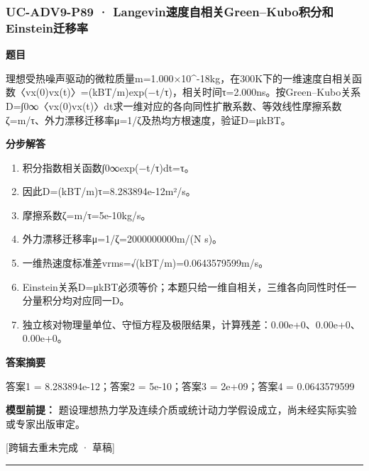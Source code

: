 \documentclass[UTF8,11pt,a4paper]{ctexart}
\begin{document}
\subsubsection*{UC-ADV9-P89 · Langevin速度自相关Green–Kubo积分和Einstein迁移率}
\noindent\textbf{题目}\par
理想受热噪声驱动的微粒质量m=1.000×10\textasciicircum{}-18kg，在300K下的一维速度自相关函数〈vx(0)vx(t)〉=(kBT/m)exp(−t/τ)，相关时间τ=2.000ns。按Green–Kubo关系D=∫0∞〈vx(0)vx(t)〉dt求一维对应的各向同性扩散系数、等效线性摩擦系数ζ=m/τ、外力漂移迁移率μ=1/ζ及热均方根速度，验证D=μkBT。\par
\medskip\noindent\textbf{分步解答}
\begin{enumerate}
\item 积分指数相关函数∫0∞exp(−t/τ)dt=τ。
\item 因此D=(kBT/m)τ=8.283894e-12m²/s。
\item 摩擦系数ζ=m/τ=5e-10kg/s。
\item 外力漂移迁移率μ=1/ζ=2000000000m/(N s)。
\item 一维热速度标准差vrms=√(kBT/m)=0.0643579599m/s。
\item Einstein关系D=μkBT必须等价；本题只给一维自相关，三维各向同性时任一分量积分均对应同一D。
\item 独立核对物理量单位、守恒方程及极限结果，计算残差：0.00e+0、0.00e+0、0.00e+0。
\end{enumerate}
\noindent\textbf{答案摘要}\par
答案1 = 8.283894e-12；答案2 = 5e-10；答案3 = 2e+09；答案4 = 0.0643579599\par
\noindent\textbf{模型前提：}
题设理想热力学及连续介质或统计动力学假设成立，尚未经实际实验或专家出版审定。\par
\noindent\textcolor{red!65!black}{[跨辑去重未完成 · 草稿]} \par
\medskip\hrule\medskip
{}
\end{document}
